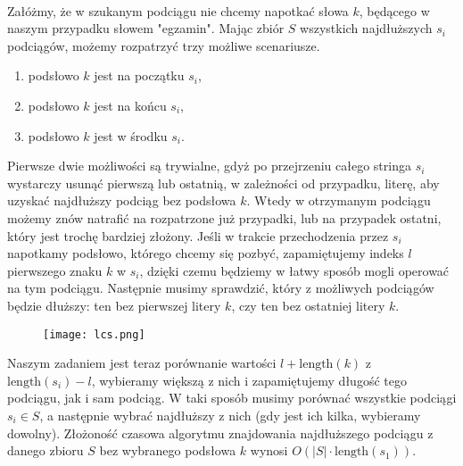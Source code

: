 \documentclass[a4paper,12pt]{article}
\begin{document}
~\\ \noindent Załóżmy, że w szukanym podciągu nie chcemy napotkać słowa $k$, będącego w naszym przypadku słowem "egzamin". Mając zbiór $S$ wszystkich najdłuższych $s_i$ podciągów, możemy rozpatrzyć trzy możliwe scenariusze.
\begin{enumerate}
\item podsłowo $k$ jest na początku $s_i$,
\item podsłowo $k$ jest na końcu $s_i$,
\item podsłowo $k$ jest w środku $s_i$.
\end{enumerate}
\noindent Pierwsze dwie możliwości są trywialne, gdyż po przejrzeniu całego stringa $s_i$ wystarczy usunąć pierwszą lub ostatnią, w zależności od przypadku, literę, aby uzyskać najdłuższy podciąg bez podsłowa $k$. Wtedy w otrzymanym podciągu możemy znów natrafić na rozpatrzone już przypadki, lub na przypadek ostatni, który jest trochę bardziej złożony. Jeśli w trakcie przechodzenia przez $s_i$ napotkamy podsłowo, którego chcemy się pozbyć, zapamiętujemy indeks $l$ pierwszego znaku $k$ w $s_i$, dzięki czemu będziemy w łatwy sposób mogli operować na tym podciągu. Następnie musimy sprawdzić, który z możliwych podciągów będzie dłuższy: ten bez pierwszej litery $k$, czy ten bez ostatniej litery $k$.
\begin{figure}[H]
\centering
\texttt{[image: lcs.png]}
\end{figure}
\noindent Naszym zadaniem jest teraz porównanie wartości $l+\text{length}(k)$ z $\text{length}(s_i)-l$, wybieramy większą z nich i zapamiętujemy długość tego podciągu, jak i sam podciąg. W taki sposób musimy porównać wszystkie podciągi $s_i \in S$, a następnie wybrać najdłuższy z nich (gdy jest ich kilka, wybieramy dowolny). Złożoność czasowa algorytmu znajdowania najdłuższego podciągu z danego zbioru $S$ bez wybranego podsłowa $k$ wynosi $O(\vert S \vert \cdot \text{length}(s_1))$.
\end{document}
